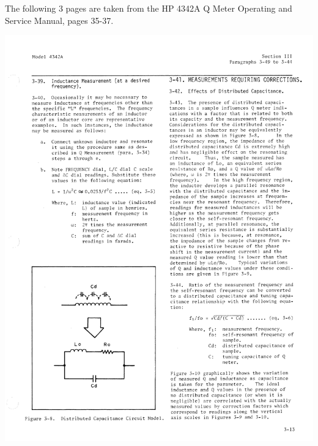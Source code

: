 \documentclass[titlepage, letterpaper, 11pt]{article}
\begin{document}
The following 3 pages are taken from the HP 4342A Q Meter Operating
and Service Manual, pages 35-37.

\clearpage
\includegraphics[width=1\textwidth]{qMeter/page35}
\end{document}
